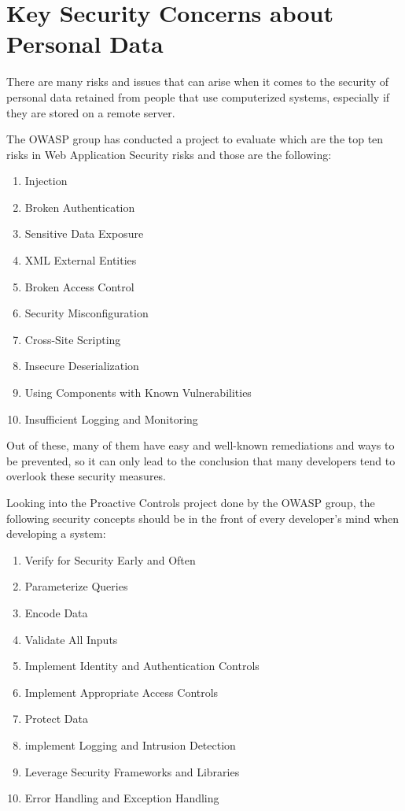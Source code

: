 \chapter{Key Security Concerns about Personal Data}

There are many risks and issues that can arise when it comes to the security of personal data retained from people that use computerized systems, especially if they are stored on a remote server.

The OWASP group has conducted a project to evaluate which are the top ten risks in Web Application Security risks and those are the following:
\begin{enumerate}
  \item Injection
  \item Broken Authentication
  \item Sensitive Data Exposure
  \item XML External Entities
  \item Broken Access Control
  \item Security Misconfiguration
  \item Cross-Site Scripting
  \item Insecure Deserialization
  \item Using Components with Known Vulnerabilities
  \item Insufficient Logging and Monitoring
\end{enumerate}

Out of these, many of them have easy and well-known remediations and ways to be prevented, so it can only lead to the conclusion that many developers tend to overlook these security measures.

Looking into the Proactive Controls project done by the OWASP group, the following security concepts should be in the front of every developer's mind when developing a system:
\begin{enumerate}
  \item Verify for Security Early and Often
  \item Parameterize Queries
  \item Encode Data
  \item Validate All Inputs
  \item Implement Identity and Authentication Controls
  \item Implement Appropriate Access Controls
  \item Protect Data
  \item implement Logging and Intrusion Detection
  \item Leverage Security Frameworks and Libraries
  \item Error Handling and Exception Handling
\end{enumerate}
